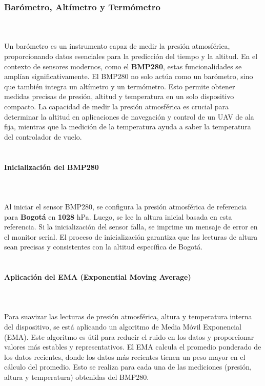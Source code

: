 \subsubsection{Barómetro, Altímetro y Termómetro}
\\ \\
Un barómetro es un instrumento capaz de medir la presión atmosférica, proporcionando datos esenciales para la predicción del tiempo y la altitud. En el contexto de sensores modernos, como el \textbf{BMP280}, estas funcionalidades se amplían significativamente. El BMP280 no solo actúa como un barómetro, sino que también integra un altímetro y un termómetro. Esto permite obtener medidas precisas de presión, altitud y temperatura en un solo dispositivo compacto. La capacidad de medir la presión atmosférica es crucial para determinar la altitud en aplicaciones de navegación y control de un UAV de ala fija, mientras que la medición de la temperatura ayuda a saber la temperatura del controlador de vuelo.\\ \\
\paragraph{\large  \textbf{Inicialización del BMP280}}\\ \\

Al iniciar el sensor BMP280, se configura la presión atmosférica de referencia para \textbf{Bogotá} en \textbf{1028} hPa. Luego, se lee la altura inicial basada en esta referencia. Si la inicialización del sensor falla, se imprime un mensaje de error en el monitor serial. El proceso de inicialización garantiza que las lecturas de altura sean precisas y consistentes con la altitud específica de Bogotá.
\\ \\
\paragraph{\large  \textbf{Aplicación del EMA (Exponential Moving Average)}}\\ \\

Para suavizar las lecturas de presión atmosférica, altura y temperatura interna del dispositivo, se está aplicando un algoritmo de Media Móvil Exponencial (EMA). Este algoritmo es útil para reducir el ruido en los datos y proporcionar valores más estables y representativos. El EMA calcula el promedio ponderado de los datos recientes, donde los datos más recientes tienen un peso mayor en el cálculo del promedio. Esto se realiza para cada una de las mediciones (presión, altura y temperatura) obtenidas del BMP280. \\

